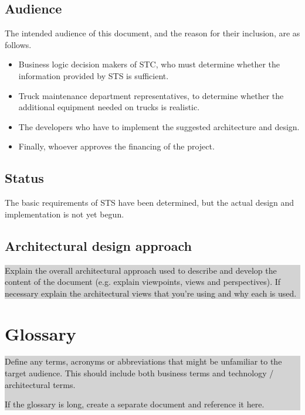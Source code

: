 \documentclass[a4paper,11pt]{report}
\newcommand{\instructions}[1]{
  \noindent\colorbox{lightgray}{%
    \parbox{\linewidth}{%
      #1
    }%
  }%
 \vspace{0.1cm}
}
\begin{document}
\section{Audience}
\label{sec:audience}

The intended audience of this document, and the reason for their
inclusion, are as follows.

\begin{itemize}
  \item Business logic decision makers of STC, who must determine
    whether the information provided by STS is sufficient.
  \item Truck maintenance department representatives, to determine
    whether the additional equipment needed on trucks is realistic.
  \item The developers who have to implement the suggested architecture and design.
  \item Finally, whoever approves the financing of the project.
\end{itemize}

\section{Status}
\label{sec:status}

The basic requirements of STS have been determined, but the actual
design and implementation is not yet begun.

\section{Architectural design approach}
\label{sec:arch-design-appr}

\instructions{
  Explain the overall architectural approach used to describe and
  develop the content of the document (e.g. explain viewpoints, views
  and perspectives). If necessary explain the architectural views that
  you’re using and why each is used.
}

\chapter{Glossary}
\label{cha:glossary}
\thispagestyle{fancy}
\instructions{
  Define any terms, acronyms or abbreviations that might be unfamiliar
  to the target audience. This should include both business terms and
  technology / architectural terms.

  If the glossary is long, create a separate document and reference it here.
}
\end{document}

